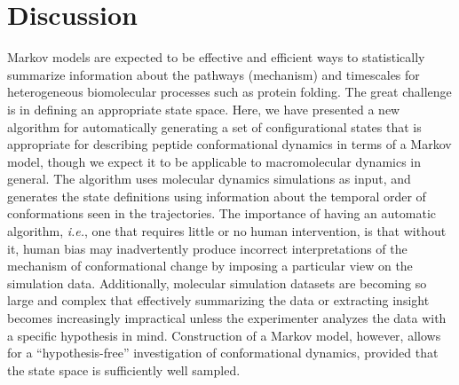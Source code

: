 
\section{Discussion}
\label{section:discussion}


Markov models are expected to be effective and efficient ways to statistically summarize information about the pathways (mechanism) and timescales for heterogeneous biomolecular processes such as protein folding.  
The great challenge is in defining an appropriate state space.  
Here, we have presented a new algorithm for automatically generating a set of configurational states that is appropriate for describing peptide conformational dynamics in terms of a Markov model, though we expect it to be applicable to macromolecular dynamics in general.  
The algorithm uses molecular dynamics simulations as input, and generates the state definitions using information about the temporal order of conformations seen in the trajectories.
The importance of having an automatic algorithm, \emph{i.e.}, one that requires little or no human intervention, is that without it, human bias may inadvertently produce incorrect interpretations of the mechanism of conformational change by imposing a particular view on the simulation data.
Additionally, molecular simulation datasets are becoming so large and complex that effectively summarizing the data or extracting insight becomes increasingly impractical unless the experimenter analyzes the data with a specific hypothesis in mind.
Construction of a Markov model, however, allows for a ``hypothesis-free'' investigation of conformational dynamics, provided that the state space is sufficiently well sampled.

